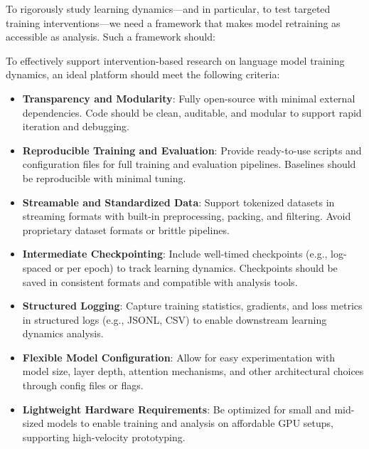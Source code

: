 To rigorously study learning dynamics—and in particular, to test targeted training interventions—we need a framework that makes model retraining as accessible as analysis. Such a framework should:

\begin{tcolorbox}[
    colback=white,
    colframe=thesisblue,
    title=\textbf{Design Requirements for Intervention-Friendly Language Model Platforms},
    fonttitle=\bfseries,
    coltitle=white,
    arc=0mm,
    boxrule=1pt,
    left=10pt,
    right=10pt,
    top=10pt,
    bottom=10pt,
    enhanced,
    breakable
]
To effectively support intervention-based research on language model training dynamics, an ideal platform should meet the following criteria:

\begin{itemize}[label=\cmark]
    \item \textbf{Transparency and Modularity}: Fully open-source with minimal external dependencies. Code should be clean, auditable, and modular to support rapid iteration and debugging.
    
    \item \textbf{Reproducible Training and Evaluation}: Provide ready-to-use scripts and configuration files for full training and evaluation pipelines. Baselines should be reproducible with minimal tuning.
    
    \item \textbf{Streamable and Standardized Data}: Support tokenized datasets in streaming formats with built-in preprocessing, packing, and filtering. Avoid proprietary dataset formats or brittle pipelines.
    
    \item \textbf{Intermediate Checkpointing}: Include well-timed checkpoints (e.g., log-spaced or per epoch) to track learning dynamics. Checkpoints should be saved in consistent formats and compatible with analysis tools.
    
    \item \textbf{Structured Logging}: Capture training statistics, gradients, and loss metrics in structured logs (e.g., JSONL, CSV) to enable downstream learning dynamics analysis.
    
    \item \textbf{Flexible Model Configuration}: Allow for easy experimentation with model size, layer depth, attention mechanisms, and other architectural choices through config files or flags.
    
    \item \textbf{Lightweight Hardware Requirements}: Be optimized for small and mid-sized models to enable training and analysis on affordable GPU setups, supporting high-velocity prototyping.
\end{itemize}
\end{tcolorbox}

